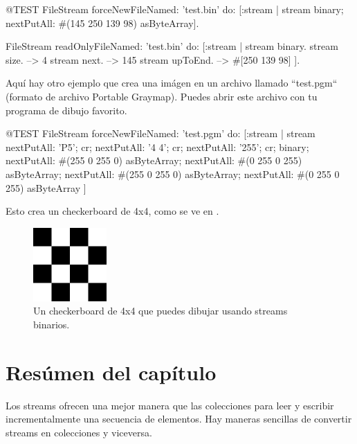 \documentclass[a4paper,10pt,twoside]{book}
\begin{document}
{\begin{code}{@TEST}
FileStream
  forceNewFileNamed: 'test.bin'
  do: [:stream |
          stream
            binary;
            nextPutAll: #(145 250 139 98) asByteArray].

FileStream
  readOnlyFileNamed: 'test.bin'
  do: [:stream |
          stream binary.
          stream size.         --> 4
          stream next.         --> 145
          stream upToEnd. --> #[250 139 98]
      ].
\end{code}

Aqu\'i hay otro ejemplo que crea una im\'agen en un archivo llamado
``test.pgm`` (formato de archivo Portable Graymap). Puedes abrir este archivo con tu programa de dibujo favorito.

\begin{code}{@TEST}
FileStream
  forceNewFileNamed: 'test.pgm' 
  do: [:stream |
	stream
		nextPutAll: 'P5'; cr;
		nextPutAll: '4 4'; cr;
		nextPutAll: '255'; cr;
		binary;
		nextPutAll: #(255 0 255 0) asByteArray;
		nextPutAll: #(0 255 0 255) asByteArray;
		nextPutAll: #(255 0 255 0) asByteArray;
		nextPutAll: #(0 255 0 255) asByteArray
	]
\end{code}

Esto crea un checkerboard de 4x4, como se ve en .

\begin{figure}[!ht]
\centerline{\includegraphics[width=0.25\textwidth]{checkerboard4x4}}
\caption{Un checkerboard de 4x4 que puedes dibujar usando streams binarios.}
\vspace{.2in}
\end{figure}

\section{Res\'umen del cap\'itulo}

Los streams ofrecen una mejor manera que las colecciones para leer y escribir incrementalmente una secuencia de elementos.
Hay maneras sencillas de convertir streams en colecciones y viceversa.

}
\end{document}
